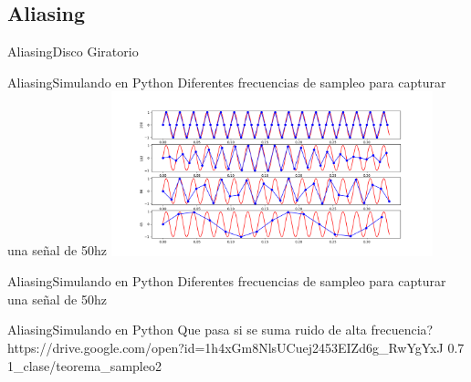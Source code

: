  \subsection{Aliasing}
 \begin{frame}{Aliasing}{Disco Giratorio}
    \vfill
 \end{frame}
 \begin{frame}{Aliasing}{Simulando en Python}
    Diferentes frecuencias de sampleo para capturar una señal de 50hz
    \center\includegraphics[width=0.7\textwidth]{1_clase/teorema_sampleo}
    \vfill
 \end{frame}
 \begin{frame}{Aliasing}{Simulando en Python}
    \handsonicon
    Diferentes frecuencias de sampleo para capturar una señal de 50hz
    
    \vfill
 \end{frame}
 \begin{frame}{Aliasing}{Simulando en Python}
    Que pasa si se suma ruido de alta frecuencia?
    {https://drive.google.com/open?id=1h4xGm8NlsUCuej2453EIZd6g_RwYgYxJ}
    {0.7}
    {1_clase/teorema_sampleo2}
    \vfill
 \end{frame}
